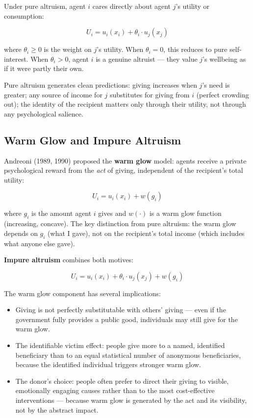 \documentclass[12pt, letterpaper]{article}
\begin{document}
Under pure altruism, agent $i$ cares directly about agent $j$'s utility or consumption:

$$U_i = u_i(x_i) + \theta_i \cdot u_j(x_j)$$

where $\theta_i \geq 0$ is the weight on $j$'s utility. When $\theta_i = 0$, this reduces to pure self-interest. When $\theta_i > 0$, agent $i$ is a genuine altruist --- they value $j$'s wellbeing as if it were partly their own.

Pure altruism generates clean predictions: giving increases when $j$'s need is greater; any source of income for $j$ substitutes for giving from $i$ (perfect crowding out); the identity of the recipient matters only through their utility, not through any psychological salience.


\subsection{Warm Glow and Impure Altruism}


Andreoni (1989, 1990) proposed the \textbf{warm glow} model: agents receive a private psychological reward from the \textit{act} of giving, independent of the recipient's total utility:

$$U_i = u_i(x_i) + w(g_i)$$

where $g_i$ is the amount agent $i$ gives and $w(\cdot)$ is a warm glow function (increasing, concave). The key distinction from pure altruism: the warm glow depends on $g_i$ (what I gave), not on the recipient's total income (which includes what anyone else gave).

\textbf{Impure altruism} combines both motives:

$$U_i = u_i(x_i) + \theta_i \cdot u_j(x_j) + w(g_i)$$

The warm glow component has several implications:
\begin{itemize}
\item Giving is not perfectly substitutable with others' giving --- even if the government fully provides a public good, individuals may still give for the warm glow.
\item The identifiable victim effect: people give more to a named, identified beneficiary than to an equal statistical number of anonymous beneficiaries, because the identified individual triggers stronger warm glow.
\item The donor's choice: people often prefer to direct their giving to visible, emotionally engaging causes rather than to the most cost-effective interventions --- because warm glow is generated by the act and its visibility, not by the abstract impact.
\end{itemize}
\end{document}
